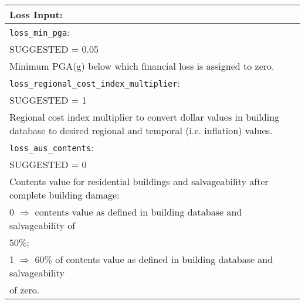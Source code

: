 \vspace{2em}
\begin{tabular}{|p{\textwidth}|}
\hline
\vspace{0.3em} \noindent \Large \textbf{Loss Input:} \normalsize \\
\hline \vspace{0.1em} \texttt{loss\_min\_pga}: \\
SUGGESTED = 0.05 \\
Minimum PGA(g) below which financial loss is assigned to zero. \\
\hline
\vspace{0.1em} \texttt{loss\_regional\_cost\_index\_multiplier}: \\
SUGGESTED = 1 \\
Regional cost index multiplier to convert dollar values in building
database to desired regional and temporal (i.e. inflation) values.\\
\hline \vspace{0.1em} \texttt{loss\_aus\_contents}: \\
SUGGESTED = 0 \\
Contents value for residential buildings and salvageability after complete building damage:   \\
\hspace{0.5em} 0 $\Rightarrow$ contents value as defined in building
  database and salvageability of \\
  \hspace{2.5em} $50\%$;\\
\hspace{0.5em} 1 $\Rightarrow$ $60\%$ of contents value as defined in
building database and salvageability \\
\hspace{2.5em} of zero.\\
  \hline
 \end{tabular}

